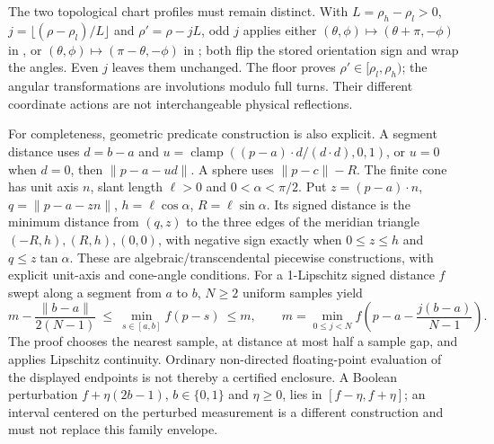 The two topological chart profiles must remain distinct. With $L=\rho_h-\rho_l>0$,
$j=\lfloor(\rho-\rho_l)/L\rfloor$ and $\rho'=\rho-jL$, odd $j$ applies either
$(\theta,\phi)\mapsto(\theta+\pi,-\phi)$ in , or
$(\theta,\phi)\mapsto(\pi-\theta,-\phi)$ in ; both flip
the stored orientation sign and wrap the angles. Even $j$ leaves them unchanged.
The floor proves $\rho'\in[\rho_l,\rho_h)$; the angular transformations are
involutions modulo full turns. Their different coordinate actions are not
interchangeable physical reflections.

For completeness, geometric predicate construction is also explicit. A segment
distance uses $d=b-a$ and
$u=\operatorname{clamp}((p-a)\cdot d/(d\cdot d),0,1)$, or $u=0$ when $d=0$,
then $\|p-a-ud\|$. A sphere uses $\|p-c\|-R$. The finite cone has unit axis $n$,
slant length $\ell>0$ and $0<\alpha<\pi/2$. Put
$z=(p-a)\cdot n$, $q=\|p-a-zn\|$, $h=\ell\cos\alpha$, $R=\ell\sin\alpha$.
Its signed distance is the minimum distance from $(q,z)$ to the three edges of
the meridian triangle $(-R,h),(R,h),(0,0)$, with negative sign exactly when
$0\le z\le h$ and $q\le z\tan\alpha$. These are algebraic/transcendental
piecewise constructions, with explicit unit-axis and cone-angle conditions.
For a 1-Lipschitz signed distance $f$ swept along a segment from $a$ to $b$,
$N\ge2$ uniform samples yield
\begin{equation}
 m-\frac{\|b-a\|}{2(N-1)}\ \le\
 \min_{s\in[a,b]}f(p-s)\ \le m,
 \qquad m=\min_{0\le j<N}f\left(p-a-\frac{j(b-a)}{N-1}\right).
\end{equation}
The proof chooses the nearest sample, at distance at most half a sample gap,
and applies Lipschitz continuity. Ordinary non-directed floating-point
evaluation of the displayed endpoints is not thereby a certified enclosure.
A Boolean perturbation $f+\eta(2b-1)$, $b\in\{0,1\}$ and $\eta\ge0$, lies in
$[f-\eta,f+\eta]$; an interval centered on the perturbed measurement is a
different construction and must not replace this family envelope.

